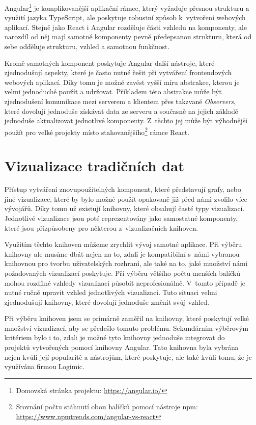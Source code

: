 Angular\footnote{Domovská stránka projektu: \url{https://angular.io/}} je komplikovanější aplikační rámec, který vyžaduje přesnou strukturu a využití jazyka TypeScript, ale poskytuje robustní způsob k~vytvoření webových aplikací. Stejně jako React i Angular rozděluje části vzhledu na komponenty, ale narozdíl od něj mají samotné komponenty pevně předepsanou strukturu, která od sebe odděluje strukturu, vzhled a samotnou funkčnost. 

Kromě samotných komponent poskytuje Angular další nástroje, které zjednodušují aspekty, které je často nutné řešit při vytváření frontendových webových aplikací. Díky tomu je možné zavést vyšší míru abstrakce, kterou je velmi jednoduché použít a udržovat. Příkladem této abstrakce může být zjednodušení komunikace mezi serverem a klientem přes takzvané \textit{Observers}, které dovolují jednoduše získávat data ze serveru a současně na jejich základě jednoduše aktualizovat jednotlivé komponenty. Z~těchto jej může být výhodnější použít pro velké projekty místo stahovanějšího\footnote{Srovnání počtu stáhnutí obou balíčků pomocí nástroje npm: \url{https://www.npmtrends.com/angular-vs-react}} rámce React.

\section{Vizualizace tradičních dat}
Přístup vytváření znovupoužitelných komponent, které představují grafy, nebo jiné vizualizace, které by bylo možné použít opakovaně již před námi zvolilo více vývojářů. Díky tomu už existují knihovny, které obsahují časté typy vizualizací. Jednotlivé vizualizace jsou poté reprezentovány jako samostatné komponenty, které jsou přizpůsobeny pro některou z~vizualizačních knihoven. 

Využitím těchto knihoven můžeme zrychlit vývoj samotné aplikace. Při výběru knihovny ale musíme dbát nejen na to, zdali je kompatibilní s~námi vybranou knihovnou pro tvorbu uživatelských rozhraní, ale také na to, jaké množství námi požadovaných vizualizací poskytuje. Při výběru většího počtu menších balíčků mohou rozdílné vzhledy vizualizací působit neprofesionálně. V~tomto případě je nutné ručně upravit vzhled jednotlivých vizualizací. Tuto situaci velmi zjednodušují knihovny, které dovolují jednoduše změnit svůj vzhled.

Při výběru knihoven jsem se primárně zaměřil na knihovny, které poskytují velké množství vizualizací, aby se předešlo tomuto problému. Sekundárním výběrovým kritériem bylo i to, zdali je možné tyto knihovny jednoduše integrovat do projektů vytvořených pomocí knihovny Angular. Tato knihovna byla vybrána nejen kvůli její popularitě a nástrojům, které poskytuje, ale také kvůli tomu, že je využívána firmou Logimic.

